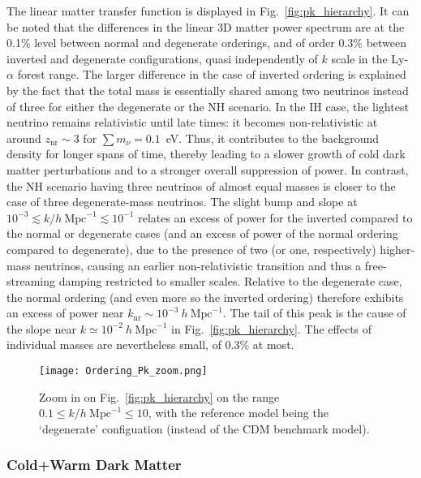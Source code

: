 The linear matter transfer function is displayed in Fig.~\ref{fig:pk_hierarchy}. It can be noted that the differences in the linear 3D matter power spectrum are at the 0.1\% level between normal and degenerate orderings, and of order 0.3\% between inverted and degenerate configurations, quasi independently of $k$ scale  in the Ly-$\alpha$ forest range. The larger difference in the case of inverted ordering is explained by the fact that the total mass is essentially shared among two neutrinos instead of three for either the degenerate or the NH scenario. In the IH case, the lightest neutrino remains relativistic until late times: it becomes non-relativistic at around $z_{\mathrm{nr}} \sim 3$ for $\sum m_\nu=0.1$~eV. Thus, it contributes to the background density for longer spans of time, thereby leading to a slower growth of cold dark matter perturbations and to a stronger overall suppression of power. In contrast, the NH scenario having three neutrinos of almost equal masses is closer to the case of three degenerate-mass neutrinos. The slight bump and slope at $10^{-3} \lesssim k/h~\mathrm{Mpc}^{-1} \lesssim 10^{-1}$ relates an excess of power for the inverted compared to the normal or degenerate cases (and an excess of power of the normal ordering compared to degenerate), due to the presence of two (or one, respectively) higher-mass neutrinos, causing an earlier  non-relativistic transition and thus a free-streaming damping restricted to smaller scales. Relative to the degenerate case, the normal ordering (and even more so the inverted ordering) therefore exhibits an excess of power near $k_{\mathrm{nr}}\sim 10^{-3}~h~\mathrm{Mpc}^{-1}$. The tail of this peak is the cause of the slope near $k \simeq 10^{-2}~h~\mathrm{Mpc}^{-1}$ in Fig.~\ref{fig:pk_hierarchy}. The effects of individual masses are nevertheless small, of 0.3\% at most.


\begin{figure}
\begin{center}
\texttt{[image: Ordering\_Pk\_zoom.png]}
\caption{Zoom in on Fig.~\ref{fig:pk_hierarchy} on the range $0.1 \leqslant k/h~\mathrm{Mpc}^{-1} \leqslant 10$, with the reference model being the `degenerate' configuation (instead of the CDM benchmark model).}
\label{fig:pk_hierechy_zoom}
\end{center}
\end{figure}

\subsubsection{Cold+Warm Dark Matter}
\label{sec:cwdm_linear}

